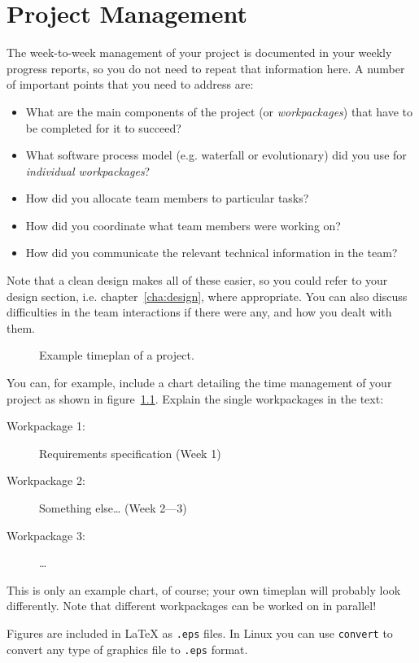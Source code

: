 
\chapter{Project Management}
\label{cha:management}

The week-to-week management of your project is documented in your weekly
progress reports, so you do not need to repeat that information here. A number
of important points that you need to address are:
\begin{itemize}
\item What are the main components of the project (or \emph{workpackages}) that have to be completed for it to succeed?
\item What software process model (e.g. waterfall or evolutionary)
did you use for \emph{individual workpackages}?
\item How did you allocate team members to particular tasks?
\item How did you coordinate what team members were working on?
\item How did you communicate the relevant technical information in the
team?
\end{itemize}
Note that a clean design makes all of these easier, so you could
refer to your design section, i.e. chapter~\ref{cha:design}, where
appropriate. You can also discuss difficulties in the team
interactions if there were any, and how you dealt with them.

\begin{figure}
  \centering
  \caption{Example timeplan of a project.}
  \label{fig:timeplan}
\end{figure}
You can, for example, include a chart detailing the time management of your
project as shown in figure~\ref{fig:timeplan}. Explain the single workpackages
in the text:
\begin{description}
\item[Workpackage 1:] Requirements specification
  \hfill (Week 1)
\item[Workpackage 2:] Something else\ldots
  \hspace*{\fill} (Week 2---3)
\item[Workpackage 3:] \ldots
\end{description}
This is only an example chart, of course; your own timeplan will
probably look differently. Note that different workpackages can be
worked on in parallel!

Figures are included in {\LaTeX} as \texttt{.eps} files. In Linux
you can use \texttt{convert} to convert any type of graphics file to
\texttt{.eps} format.
